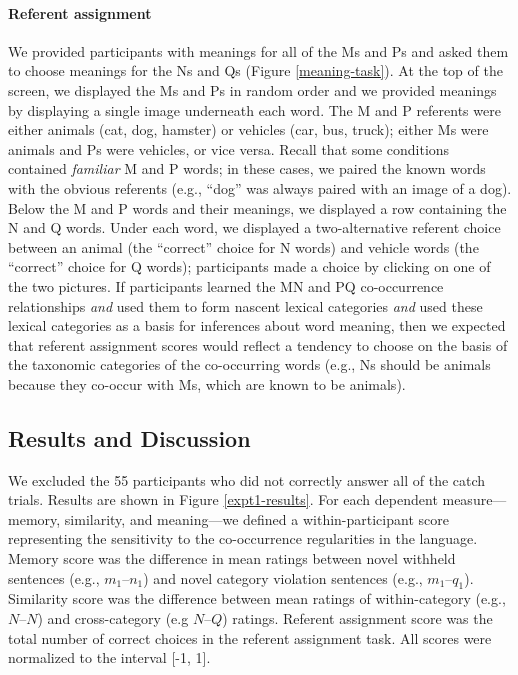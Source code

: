 \documentclass[man,floatsintext]{apa6}
\begin{document}
\paragraph{Referent assignment}
We provided participants with meanings for all of the Ms and Ps and asked them to choose meanings for the Ns and Qs (Figure \ref{meaning-task}). At the top of the screen, we displayed the Ms and Ps in random order and we provided meanings by displaying a single image underneath each word. The M and P referents were either animals (cat, dog, hamster) or vehicles (car, bus, truck); either Ms were animals and Ps were vehicles, or vice versa. Recall that some conditions contained \emph{familiar} M and P words; in these cases, we paired the known words with the obvious referents (e.g., ``dog'' was always paired with an image of a dog). Below the M and P words and their meanings, we displayed a row containing the N and Q words. Under each word, we displayed a two-alternative referent choice between an animal (the ``correct'' choice for N words) and vehicle words (the ``correct'' choice for Q words); participants made a choice by clicking on one of the two pictures. If participants learned the MN and PQ co-occurrence relationships \emph{and} used them to form nascent lexical categories \emph{and} used these lexical categories as a basis for inferences about word meaning, then we expected that referent assignment scores would reflect a tendency to choose on the basis of the taxonomic categories of the co-occurring words (e.g., Ns should be animals because they co-occur with Ms, which are known to be animals).


\subsection{Results and Discussion}
We excluded the 55 participants who did not correctly answer all of the catch trials. Results are shown in Figure \ref{expt1-results}. For each dependent measure---memory, similarity, and meaning---we defined a within-participant score representing the sensitivity to the co-occurrence regularities in the language. Memory score was the difference in mean ratings between novel withheld sentences (e.g., $m_1$--$n_1$) and novel category violation sentences (e.g., $m_1$--$q_1$). Similarity score was the difference between mean ratings of within-category (e.g., $N$--$N$) and cross-category (e.g $N$--$Q$) ratings. Referent assignment score was the total number of correct choices in the referent assignment task. All scores were normalized to the interval [-1, 1].
\end{document}
